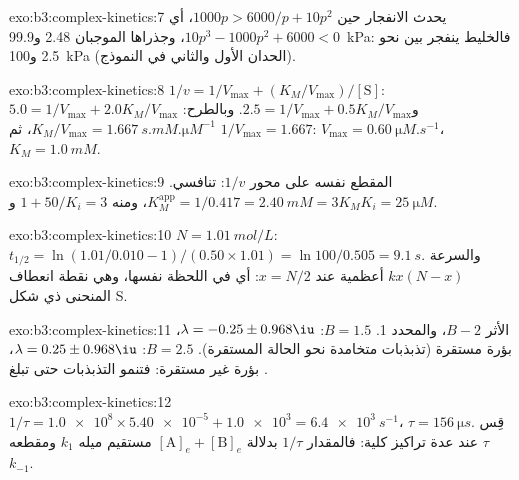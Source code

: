 \begin{solution}{exo:b3:complex-kinetics:7}
يحدث الانفجار حين $1000p > 6000/p + 10p^2$، أي $10p^3 - 1000p^2 + 6000 < 0$، وجذراها
الموجبان 2.48 و\qty{99.9}{kPa}: فالخليط ينفجر بين نحو 2.5 
و\qty{100}{kPa} (الحدان الأول والثاني في النموذج).
\end{solution}

\begin{solution}{exo:b3:complex-kinetics:8}
$1/v = 1/V_{\max} + (K_M/V_{\max})/[\mathrm S]$: $5.0 = 1/V_{\max} + 2.0K_M/V_{\max}$ و$2.5 = 1/V_{\max} + 0.5K_M/V_{\max}$.
وبالطرح: $K_M/V_{\max} = \qty{1.667}{s.mM.\micro M^{-1}}$، ثم $1/V_{\max} = 1.667$: $V_{\max} = \qty{0.60}{\micro M.s^{-1}}$،
$K_M = \qty{1.0}{mM}$.
\end{solution}

\begin{solution}{exo:b3:complex-kinetics:9}
المقطع نفسه على محور $1/v$: تنافسي. $K_M^{\mathrm{app}} = 1/0.417 = \qty{2.40}{mM} = 3K_M$، ومنه
$1 + 50/K_i = 3$ و$K_i = \qty{25}{\micro M}$.
\end{solution}

\begin{solution}{exo:b3:complex-kinetics:10}
$N = \qty{1.01}{mol/L}$: $t_{1/2} = \ln(1.01/0.010 - 1)/(0.50 \times 1.01) = \ln100/0.505 = \qty{9.1}{s}$. 
والسرعة $kx(N - x)$ أعظمية عند $x = N/2$: أي في اللحظة نفسها، وهي نقطة انعطاف المنحنى
ذي شكل S.
\end{solution}

\begin{solution}{exo:b3:complex-kinetics:11}
الأثر $B - 2$، والمحدد 1. $B = 1.5$: $\lambda = -0.25 \pm 0.968\iu$، بؤرة مستقرة (تذبذبات
متخامدة نحو الحالة المستقرة). $B = 2.5$: $\lambda = 0.25 \pm 0.968\iu$، بؤرة غير مستقرة:
فتنمو التذبذبات حتى تبلغ .
\end{solution}

\begin{solution}{exo:b3:complex-kinetics:12}
$1/\tau = \num{1.0e8} \times \num{5.40e-5} + \num{1.0e3} = \qty{6.4e3}{s^{-1}}$، $\tau = \qty{156}{\micro s}$. قِس $\tau$ عند عدة
تراكيز كلية: فالمقدار $1/\tau$ بدلالة $[\mathrm A]_e + [\mathrm B]_e$ مستقيم ميله $k_1$ 
ومقطعه $k_{-1}$.
\end{solution}

